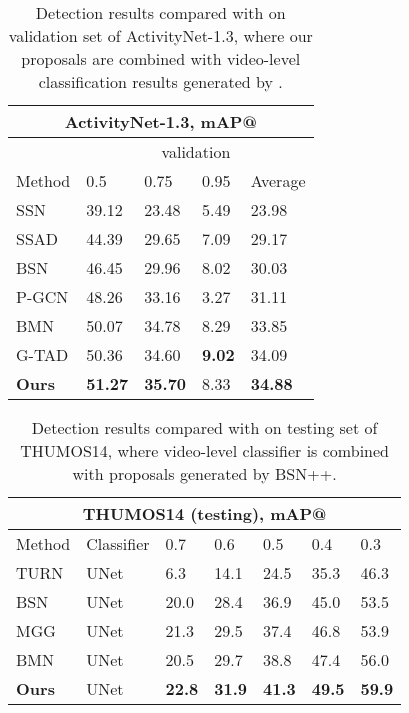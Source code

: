\documentclass[letterpaper]{article} \usepackage{aaai21}  \usepackage{times}  \usepackage{helvet} \usepackage{courier}  \usepackage[hyphens]{url}  \usepackage{graphicx} \urlstyle{rm} \def\UrlFont{\rm}  \usepackage{natbib}  \usepackage{amsmath,amssymb} \usepackage{caption} \frenchspacing  \usepackage{color}
\begin{document}
 \setlength{\tabcolsep}{10pt}
\begin{table}[t]
\centering
	\caption{Detection results compared with \cite{SSN,SSAD,BSN,LinBMN,PGCN,GTAD} on validation set of ActivityNet-1.3, where our proposals are combined with video-level classification results generated by \cite{xiong2016cuhk}.}
	\small
	\begin{tabular}{p{1.5cm}p{0.62cm}<{\centering}p{0.62cm}<{\centering}p{0.62cm}<{\centering}p{0.9cm}<{\centering}}
		\toprule
		\multicolumn{5}{c}{ {\bf ActivityNet-1.3}, mAP@}  \\
		\hline
		& \multicolumn{4}{c}{validation} \\
		\hline
		Method  & 0.5  &  0.75  & 0.95  & Average  \\
		\hline
		SSN    & 39.12 & 23.48  & 5.49  & 23.98\\
		SSAD & 44.39  & 29.65  & 7.09  & 29.17 \\
		BSN & 46.45 & 29.96 & 8.02 & 30.03\\
		P-GCN & 48.26 & 33.16 & 3.27 & 31.11 \\ 
		BMN & 50.07 & 34.78 & 8.29 & 33.85\\
		G-TAD & 50.36 & 34.60 & \textbf{9.02} & 34.09   \\
		\hline
		\textbf{Ours} & \textbf{51.27}  & \textbf{35.70}  & 8.33  & \textbf{34.88} \\
		\bottomrule
	\end{tabular}
	\label{table_detection_anet}
\end{table}


\setlength{\tabcolsep}{5pt}
\begin{table}[t]
\centering
	\caption{Detection results compared with \cite{gao2017turn,BSN,LiuMulti,LinBMN} on testing set of THUMOS14, where video-level classifier \cite{L.Wang} is combined with proposals generated by BSN++.}
	\small
	\begin{tabular}{p{2cm}|p{1.1cm}<{\centering}|p{0.5cm}<{\centering}p{0.5cm}<{\centering}p{0.5cm}<{\centering}p{0.5cm}<{\centering}p{0.5cm}<{\centering}}
		\toprule
		\multicolumn{7}{c}{ {\bf THUMOS14} (testing), mAP@}  \\
		\hline
		\noalign{\smallskip}
		Method & Classifier & 0.7 & 0.6 & 0.5 & 0.4 & 0.3  \\
		\noalign{\smallskip}
		\hline
		\noalign{\smallskip}
		TURN & UNet	& 6.3 & 14.1 & 24.5 & 35.3 &  46.3\\
		BSN & UNet & 20.0 & 28.4 & 36.9 & 45.0 & 53.5\\
		MGG & UNet & 21.3 & 29.5 & 37.4 & 46.8 & 53.9\\
		BMN & UNet & 20.5 & 29.7 & 38.8 & 47.4 & 56.0\\
		\noalign{\smallskip}
		\hline
		\noalign{\smallskip}
		\textbf{Ours} & UNet & \textbf{22.8} & \textbf{31.9} & \textbf{41.3} & \textbf{49.5} & \textbf{59.9}\\
		\bottomrule
	\end{tabular}
	\label{table_detection_thumos}
\normalsize
	
\end{table}
\end{document}
